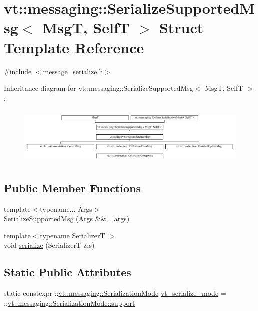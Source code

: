 \hypertarget{structvt_1_1messaging_1_1_serialize_supported_msg}{}\section{vt\+:\+:messaging\+:\+:Serialize\+Supported\+Msg$<$ MsgT, SelfT $>$ Struct Template Reference}
\label{structvt_1_1messaging_1_1_serialize_supported_msg}


{\ttfamily \#include $<$message\+\_\+serialize.\+h$>$}

Inheritance diagram for vt\+:\+:messaging\+:\+:Serialize\+Supported\+Msg$<$ MsgT, SelfT $>$\+:\begin{figure}[H]
\begin{center}
\leavevmode
\includegraphics[height=2.871795cm]{structvt_1_1messaging_1_1_serialize_supported_msg}
\end{center}
\end{figure}
\subsection*{Public Member Functions}
\begin{DoxyCompactItemize}
\item 
{\footnotesize template$<$typename... Args$>$ }\\\hyperlink{structvt_1_1messaging_1_1_serialize_supported_msg_a38a364cb0fdfb2822d4b65dcba7d05ef}{Serialize\+Supported\+Msg} (Args \&\&... args)
\item 
{\footnotesize template$<$typename SerializerT $>$ }\\void \hyperlink{structvt_1_1messaging_1_1_serialize_supported_msg_a361827e8eb53fbd212b8f702485ff297}{serialize} (SerializerT \&s)
\end{DoxyCompactItemize}
\subsection*{Static Public Attributes}
\begin{DoxyCompactItemize}
\item 
static constexpr \+::\hyperlink{namespacevt_1_1messaging_a436c5b9fc7f591e5978a136999cb9ef8}{vt\+::messaging\+::\+Serialization\+Mode} \hyperlink{structvt_1_1messaging_1_1_serialize_supported_msg_a4bc4c6e7b2b6201ce8fc47babc34d799}{vt\+\_\+serialize\+\_\+mode} = \+::\hyperlink{namespacevt_1_1messaging_a436c5b9fc7f591e5978a136999cb9ef8a434990c8a25d2be94863561ae98bd682}{vt\+::messaging\+::\+Serialization\+Mode\+::support}
\end{DoxyCompactItemize}


